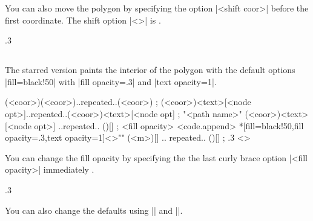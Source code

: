 You can also move the polygon by specifying the option |<shift coor>| before the first coordinate.
The  shift option |<>| is .

\begin{tzcode}{.3}
\end{tzcode}



\subsection{\protect\cmd{\tzpolygon*}}
\label{ss:tzpolygon*}

The starred version \icmd{\tzpolygon*} paints the interior of the polygon with the default options |fill=black!50| with |fill opacity=.3| and |text opacity=1|.

\begin{tzdef}{}
\tzpolygon*(<coor>)(<coor>)..repeated..(<coor>) ;
\tzpolygon*(<coor>){<text>}[<node opt>]..repeated..(<coor>){<text>}[<node opt] ;
"<path name>" 
           (<coor>){<text>}[<node opt>]
           ..repeated.. (){}[] ; {<fill opacity>} <code.append>
 *[fill=black!50,fill opacity=.3,text opacity=1]<>""
  (<m>){}[] .. repeated.. (){}[] ; {.3} <>
\end{tzdef}

You can change the fill opacity by specifying the the last curly brace option |{<fill opacity>}| immediately .

\begin{tzcode}{.3}
\end{tzcode}

You can also change the defaults using |\settzfillcolor| and |\settzfillopacity|.


